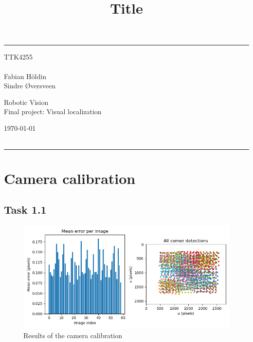 \documentclass[a4paper]{article} %
\begin{document}

    \title{Title} %
    \fancyhead[C]{}
    \hrule \medskip %
    \begin{minipage}{0.295\textwidth} %
        \raggedright
        TTK4255\\ %
        \footnotesize %
        \hfill\\
        Fabian Höldin \\
         Sindre {\O}versveen%
    \end{minipage}
    \begin{minipage}{0.4\textwidth} %
        \centering
        \large %
        Robotic Vision \\ %
        \normalsize %
        Final project: Visual localization\\ %
    \end{minipage}
    \begin{minipage}{0.295\textwidth} %
        \raggedleft
        \today\\ %
        \footnotesize %
        \hfill\\
    \end{minipage}
    \medskip\hrule %
    
\section{Camera calibration}

    \subsection*{Task 1.1}

    \begin{figure}[h]
        \center
        \includegraphics[width= \linewidth]{calibrationResult}
        \caption{Results of the camera calibration}
    \end{figure}
\end{document}
